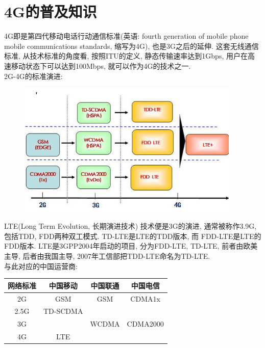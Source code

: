 \section {\ZHH 4G的普及知识} {

    {4G即是第四代移动电话行动通信标准(英语: fourth generation of mobile phone mobile communications standards, 缩写为4G), 也是3G之后的延伸. 这套无线通信标准, 从技术标准的角度看, 按照ITU的定义, 静态传输速率达到1Gbps, 用户在高速移动状态下可以达到100Mbps, 就可以作为4G的技术之一. } \\

    \vspace {6pt}
    {2G-4G的标准演进: } \\
    \begin {figure} [htbn]
        \centering
        \includegraphics [width = 300pt, keepaspectratio] {4g.jpg}
    \end {figure}

    \vspace {6pt}
    { {\ZHH LTE(Long Term Evolution, 长期演进技术) } 技术便是3G的演进, 通常被称作3.9G, 包括TDD, FDD两种双工模式. TD-LTE是LTE的TDD版本, 而 FDD-LTE是LTE的FDD版本. LTE是3GPP2004年启动的项目, 分为FDD-LTE, TD-LTE, 前者由欧美主导, 后者由我国主导, 2007年工信部把TDD-LTE命名为TD-LTE. } \\

    \vspace {6pt}
    {与此对应的中国运营商: } \\
    \begin {table} [htbp]
    \centering
    \begin {tabular} {| c | c | c | c |}
        \hline
        网络标准    &   中国移动    &   中国联通    &   中国电信    \\
        \hline
        2G          &   GSM         &   GSM         &   CDMA1x      \\
        \hline
        2.5G        &   TD-SCDMA    &               &               \\
        \hline
        3G          &               &   WCDMA       &   CDMA2000    \\
        \hline
        4G          &   LTE         &               &               \\
        \hline
    \end {tabular}
    \end {table}
}


